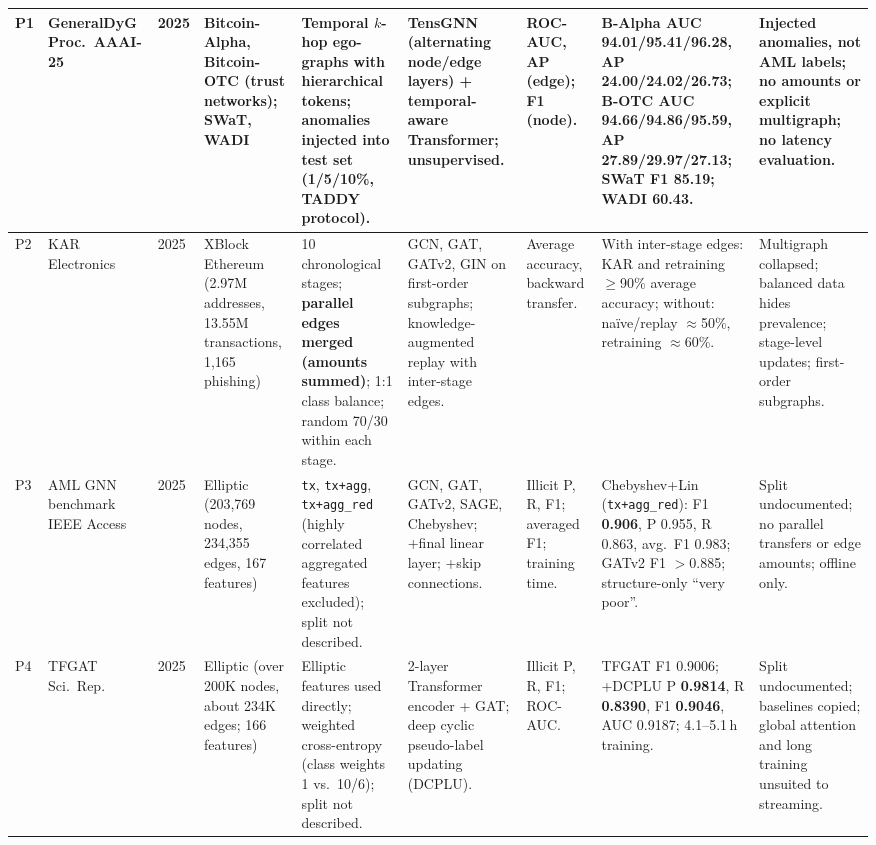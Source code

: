 \documentclass[11pt,a4paper]{article}
\begin{document}
\begin{landscape}
\begin{longtable}{L{0.55cm} L{2.3cm} L{0.8cm} L{2.6cm} L{2.9cm} L{3.0cm} L{2.1cm} L{3.2cm} L{3.6cm}}
P1 & GeneralDyG \cite{yang2025generaldyg}\newline Proc.\ AAAI-25 & 2025 & Bitcoin-Alpha, Bitcoin-OTC (trust networks); SWaT, WADI & Temporal $k$-hop ego-graphs with hierarchical tokens; anomalies injected into test set (1/5/10\%, TADDY protocol). & TensGNN (alternating node/edge layers) + temporal-aware Transformer; unsupervised. & ROC-AUC, AP (edge); F1 (node). & B-Alpha AUC 94.01/95.41/\textbf{96.28}, AP 24.00/24.02/\textbf{26.73}; B-OTC AUC 94.66/94.86/\textbf{95.59}, AP 27.89/29.97/27.13; SWaT F1 \textbf{85.19}; WADI 60.43. & Injected anomalies, not AML labels; no amounts or explicit multigraph; no latency evaluation. \\
\midrule
P2 & KAR \cite{tian2025kar}\newline Electronics & 2025 & XBlock Ethereum (2.97M addresses, 13.55M transactions, 1,165 phishing) & 10 chronological stages; \textbf{parallel edges merged (amounts summed)}; 1:1 class balance; random 70/30 within each stage. & GCN, GAT, GATv2, GIN on first-order subgraphs; knowledge-augmented replay with inter-stage edges. & Average accuracy, backward transfer. & With inter-stage edges: KAR and retraining $\geq$90\% average accuracy; without: naïve/replay $\approx$50\%, retraining $\approx$60\%. & Multigraph collapsed; balanced data hides prevalence; stage-level updates; first-order subgraphs. \\
\midrule
P3 & AML GNN benchmark \cite{ferretti2025aml}\newline IEEE Access & 2025 & Elliptic (203,769 nodes, 234,355 edges, 167 features) & \texttt{tx}, \texttt{tx+agg}, \texttt{tx+agg\_red} (highly correlated aggregated features excluded); split not described. & GCN, GAT, GATv2, SAGE, Chebyshev; +final linear layer; +skip connections. & Illicit P, R, F1; averaged F1; training time. & Chebyshev+Lin (\texttt{tx+agg\_red}): F1 \textbf{0.906}, P 0.955, R 0.863, avg.\ F1 0.983; GATv2 F1 $>$0.885; structure-only ``very poor''. & Split undocumented; no parallel transfers or edge amounts; offline only. \\
\midrule
P4 & TFGAT \cite{li2025tfgat}\newline Sci.\ Rep. & 2025 & Elliptic (over 200K nodes, about 234K edges; 166 features) & Elliptic features used directly; weighted cross-entropy (class weights 1 vs.\ 10/6); split not described. & 2-layer Transformer encoder + GAT; deep cyclic pseudo-label updating (DCPLU). & Illicit P, R, F1; ROC-AUC. & TFGAT F1 0.9006; +DCPLU P \textbf{0.9814}, R \textbf{0.8390}, F1 \textbf{0.9046}, AUC 0.9187; 4.1--5.1\,h training. & Split undocumented; baselines copied; global attention and long training unsuited to streaming. \\

\end{longtable}
\end{landscape}
\end{document}

